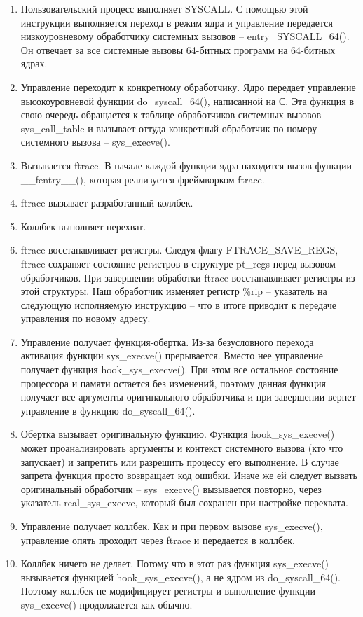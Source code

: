 \begin{enumerate}
	\item Пользовательский процесс выполняет SYSCALL. С помощью этой инструкции выполняется переход в режим ядра и управление передается низкоуровневому обработчику системных вызовов -- entry\_SYSCALL\_64(). Он отвечает за все системные вызовы 64-битных программ на 64-битных ядрах.
	\item Управление переходит к конкретному обработчику. Ядро передает управление высокоуровневой функции do\_syscall\_64(), написанной на С. Эта функция в свою очередь обращается к таблице обработчиков системных вызовов sys\_call\_table и вызывает оттуда конкретный обработчик по номеру системного вызова -- sys\_execve().
	\item Вызывается ftrace. В начале каждой функции ядра находится вызов функции \_\_fentry\_\_(), которая реализуется фреймворком ftrace. 
	\item ftrace вызывает разработанный коллбек. 
	\item Коллбек выполняет перехват. 
	\item ftrace восстанавливает регистры. Следуя флагу FTRACE\_SAVE\_REGS, ftrace сохраняет состояние регистров в структуре pt\_regs перед вызовом обработчиков. При завершении обработки ftrace восстанавливает регистры из этой структуры. Наш обработчик изменяет регистр \%rip -- указатель на следующую исполняемую инструкцию -- что в итоге приводит к передаче управления по новому адресу.
	\item Управление получает функция-обертка. Из-за безусловного перехода активация функции sys\_execve() прерывается. Вместо нее управление получает функция hook\_sys\_execve(). При этом все остальное состояние процессора и памяти остается без изменений, поэтому данная функция получает все аргументы оригинального обработчика и при завершении вернет управление в функцию do\_syscall\_64().
	\item Обертка вызывает оригинальную функцию. Функция hook\_sys\_execve() может проанализировать аргументы и контекст системного вызова (кто что запускает) и запретить или разрешить процессу его выполнение. В случае запрета функция просто возвращает код ошибки. Иначе же ей следует вызвать оригинальный обработчик -- sys\_execve() вызывается повторно, через указатель real\_sys\_execve, который был сохранен при настройке перехвата.
	\item Управление получает коллбек. Как и при первом вызове sys\_execve(), управление опять проходит через ftrace и передается в коллбек. 
	\item Коллбек ничего не делает. Потому что в этот раз функция sys\_execve() вызывается функцией hook\_sys\_execve(), а не ядром из do\_syscall\_64(). Поэтому коллбек не модифицирует регистры и выполнение функции sys\_execve() продолжается как обычно. 

\end{enumerate}

